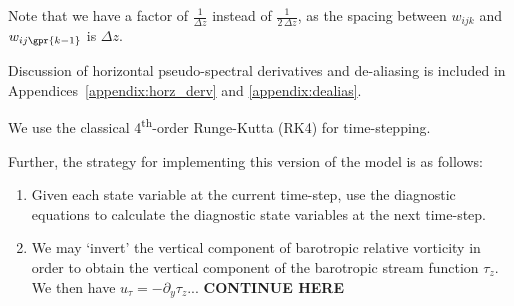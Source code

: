 Note that we have a factor of $\frac{1}{\Delta z}$ instead of $\frac{1}{2\,\Delta z}$, as the spacing between $w_{ijk}$ and $w_{ij\gpr{k-1}}$ is $\Delta z$.

Discussion of horizontal pseudo-spectral derivatives and de-aliasing is included in Appendices~\ref{appendix:horz_derv} and \ref{appendix:dealias}.

We use the classical 4\textsuperscript{th}-order Runge-Kutta (RK4) for time-stepping.

Further, the strategy for implementing this version of the model is as follows:

\begin{enumerate}[1.]
	\item Given each state variable at the current time-step, use the diagnostic equations to calculate the diagnostic state variables at the next time-step.
	\item We may `invert' the vertical component of barotropic relative vorticity in order to obtain the vertical component of the barotropic stream function $\tau_z$. We then have $u_\tau = -\partial_y \tau_z$... \textbf{CONTINUE HERE}
\end{enumerate}
